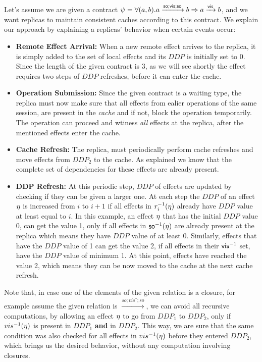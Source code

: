 Let's assume we are given a contract $\psi=\forall (a,b). a
\xrightarrow{{\normalfont \textsf{so}};{\normalfont \textsf{vis}};{\normalfont \textsf{so}}}b \Rightarrow a \xrightarrow{{\normalfont \textsf{vis}}} b$, and
we want replicas to maintain consistent caches according to this
contract. We explain our approach by
explaining a replicas' behavior when certain events occur: 
\begin{itemize}
\item {\bf Remote Effect Arrival:} When a new remote effect arrives to the
replica, it is simply added to the set of local effects and 
its $DDP$ is initially set to 0. Since the length of the
given contract is 3, as we will see shortly the effect requires two
steps
of $DDP$ refreshes, before it can enter the cache.
\item {\bf Operation Submission: } Since the given contract is a waiting
type, the replica must now make sure that all effects from ealier
operations of the same session, are present in the \emph{cache} and if
not, 
block the operation temporarily. The operation can proceed and
wtiness \emph{all} effects at the replica, after the mentioned effects enter
the cache.
\item {\bf Cache Refresh: } The replica, must periodically perform 
cache refreshes and move effects from $DDP_2$ to the cache. As explained
we know that the complete set of dependencies for these effects are
already present. 
\item {\bf DDP Refresh: } At this periodic step, $DDP$ of effects are
updated by checking if they can be given a larger one. 
At each step the $DDP$ of an effect $\eta$ is increased from $i$ to $i+1$ if
all effects in $r_i^{-1}(\eta)$ already have $DDP$ value at least equal to $i$.
In this example, an effect $\eta$ that has the initial $DDP$ value 0, can get
the value 1, only if all effects in  ${\normalfont \textsf{so}}^{-1}(\eta)$ are already
present at the replica which means they have $DDP$ value of at least 0.
Similarly, effects that have the $DDP$ value of 1 can get the value 2,
if all effects in their ${\normalfont \textsf{vis}}^{-1}$ set, have the $DDP$ value of
minimum 1. At this point, effects have reached the value 2, which means
they can be now moved to the cache at the next cache refresh.
\end{itemize}
Note that, in case one of the elements of the given relation is a
closure, for example assume the given relation is $\xrightarrow{so;vis^*;so}$,
we can avoid all recursive computations, by allowing an effect $\eta$
to go from $DDP_1$ to $DDP_2$, only if $vis^{-1}(\eta)$ is present in
$DDP_1$ {\bf and} in $DDP_2$. This way, we are sure that the same
condition was also checked for all effects in $vis^{-1}(\eta)$ before they
entered $DDP_2$, which brings us the desired behavior, without any
computation involving closures.




